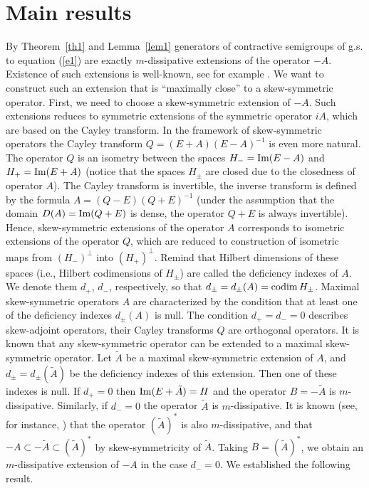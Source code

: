 \documentclass[12pt]{article}
\newcommand{\codim}{\mathop{\rm codim}}
\renewcommand{\Im}{\mathop{\rm Im}}
\numberwithin{equation}{section}
\theoremstyle{plain}
\theoremstyle{definition}
\begin{document}
\section{Main results}

By Theorem~\ref{th1} and Lemma~\ref{lem1} generators of contractive semigroups of g.s. to equation (\ref{e1}) are exactly $m$-dissipative extensions of the operator $-A$. Existence of such extensions is well-known, see for example
\cite{Phil}. We want to construct such an extension that is ``maximally close'' to a skew-symmetric operator. First, we need to choose a skew-symmetric extension of $-A$. Such extensions reduces to symmetric extensions of the symmetric operator $iA$, which are based on the Cayley transform. In the framework of skew-symmetric operators the Cayley transform $Q=(E+A)(E-A)^{-1}$ is even more natural. The operator $Q$ is an isometry between the spaces $H_-=\Im (E-A)$ and $H_+=\Im (E+A)$ (notice that the spaces $H_\pm$ are closed due to the closedness of operator $A$). The Cayley transform is invertible, the inverse transform is defined by the formula $A=(Q-E)(Q+E)^{-1}$ (under the assumption that the domain
$D(A)=\Im(Q+E)$ is dense, the operator $Q+E$ is always invertible). Hence, skew-symmetric extensions of the operator $A$ corresponds to isometric extensions of the operator $Q$, which are reduced to construction of isometric maps from $(H_-)^\perp$ into $(H_+)^\perp$. Remind that Hilbert dimensions of these spaces (i.e., Hilbert codimensions of $H_\pm$) are called the deficiency indexes of $A$. We denote them $d_+$, $d_-$, respectively, so that $d_\pm=d_\pm(A)=\codim H_\pm$. Maximal skew-symmetric operators $A$ are characterized by the condition that at least one of the deficiency indexes $d_\pm(A)$ is null. The condition $d_+=d_-=0$ describes skew-adjoint operators, their Cayley transforms $Q$ are orthogonal operators. It is known that any skew-symmetric operator can be extended to a maximal skew-symmetric operator. Let $\tilde A$ be a maximal skew-symmetric extension of $A$, and $d_\pm=d_\pm(\tilde A)$ be the deficiency indexes of this extension. Then one of these indexes is null. If $d_+=0$ then $\Im(E+\tilde A)=H$ and the operator $B=-\tilde A$ is $m$-dissipative.
Similarly, if $d_-=0$ the operator $\tilde A$ is $m$-dissipative. It is known (see, for instance, \cite[Theorem~1.1.2]{Phil}) that the operator $(\tilde A)^*$ is also $m$-dissipative, and that
$-A\subset -\tilde A\subset (\tilde A)^*$ by skew-symmetricity of $\tilde A$. Taking
$B=(\tilde A)^*$, we obtain an $m$-dissipative extension of $-A$ in the case $d_-=0$. We established the following result.
\end{document}
